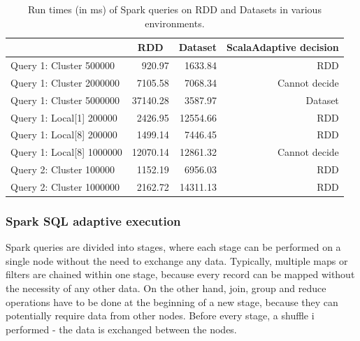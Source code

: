 \begin{table}[h!]
	\centering
	\captionsetup{justification=centering,margin=0.5cm}
	\bgroup
	\def\arraystretch{1.5}%
	\begin{tabular}{|l|r|r|r|}
		\hline
		& \multicolumn{1}{c|}{\textbf{RDD}} & \multicolumn{1}{c|}{\textbf{Dataset}} & \multicolumn{1}{c|}{\textbf{ScalaAdaptive decision}} \\ \hline
		Query 1: Cluster 500000       & 920.97                            & 1633.84                           & RDD                                                  \\ \hline
		Query 1: Cluster 2000000      & 7105.58                           & 7068.34                           & Cannot decide                                         \\ \hline
		Query 1: Cluster 5000000      & 37140.28                          & 3587.97                           & Dataset                                                  \\ \hline
		Query 1: Local{[}1{]} 200000  & 2426.95                           & 12554.66                          & RDD                                                  \\ \hline
		Query 1: Local{[}8{]} 200000  & 1499.14                           & 7446.45                           & RDD                                                  \\ \hline
		Query 1: Local{[}8{]} 1000000 & 12070.14                          & 12861.32                          & Cannot decide                                         \\ \hline
		Query 2: Cluster 100000 & 1152.19 &	6956.03 & RDD \\ \hline
		Query 2: Cluster 1000000      & 2162.72                           & 14311.13                          & RDD                                                  \\ \hline
	\end{tabular}
\egroup
\caption{Run times (in ms) of Spark queries on RDD and Datasets in various environments.}
\label{tab:spark_adaptive_rdd_vs_ds_test}
\end{table}

\subsubsection{Spark SQL adaptive execution}

Spark queries are divided into stages, where each stage can be performed on a single node without the need to exchange any data. Typically, multiple maps or filters are chained within one stage, because every record can be mapped without the necessity of any other data. On the other hand, join, group and reduce operations have to be done at the beginning of a new stage, because they can potentially require data from other nodes. Before every stage, a shuffle i performed - the data is exchanged between the nodes. 

